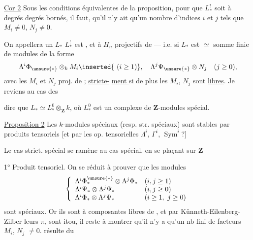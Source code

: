 \uline{Cor 2} Sous les conditions équivalentes de
la proposition, pour que $L^!_*$ soit à degrés
 degrés bornés, il faut,
qu'il n'y ait qu'un nombre  d'indices
$i$ et $j$ tels que $M_i\neq0$, $N_j\neq0$.

On appellera un $L_*$  
$L^!_*$ est , 
et à $H_n$ projectifs de  --- i.e.
si $L_*$ est $\simeq$ somme finie de
modules de la forme 
\[
\Lambda^i\Phi_{\unsure{*}}\otimes_k M_i\inserted{\ (i\geq1)},\quad
\Lambda^j\Psi_{\unsure{*}}\otimes N_j\quad(j\geq0),
\]
avec les $M_i$ et $N_j$ proj. de ; \uline{stricte-}
\uline{ment } si de plus les
$M_i$, $N_j$ sont \uline{libres}. Je reviens au cas des

dire que $L_*\simeq L^0_*\otimes_{\mathbf Z}k$, où $L^0_*$
est un complexe de $\mathbf Z$-modules 
spécial.

\uline{Proposition 2} Les $k$-modules  spéciaux
(resp. str. spéciaux) sont stables par
produits tensoriels [et par les op.
tensorielles $\Lambda^i$, $\Gamma^i$, $\operatorname{Sym}^i$?]

Le cas strict. spécial se ramène
au cas spécial, en se plaçant sur $\mathbf Z$\unsure{\ldots}

1° Produit tensoriel. On se réduit
à prouver que les modules
\[
\left\{\begin{array}{ll}
\Lambda^i\Phi_*^{\unsure{*}}\otimes\Lambda^j\Phi_* &(i,j\geq1)\\
\Lambda^i\Psi_*\otimes\Lambda^j\Psi_* &(i,j\geq0)\\
\Lambda^i\Phi_*\otimes\Lambda^j\Psi_* &(i\geq1,\ j\geq0)
\end{array}\right.
\]
sont spéciaux. Or ils sont à composantes
libres de , et par Künneth-Eilenberg-
Zilber leurs $\pi_i$ sont itou, il reste à
montrer qu'il n'y a qu'un nb fini
de facteurs $M_i$, $N_j$ $\neq0$.  
 résulte du


